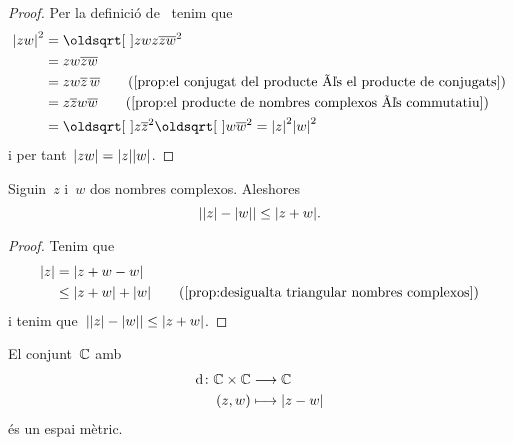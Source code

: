 \documentclass[../Apunts.tex]{subfiles}
\begin{document}
    \begin{proof}
        Per la definició de~ tenim que
        \begin{align*}
            \modul{zw}^{2}&=\sqrt{zwz\conjugat{zw}}^{2} \\
            &=zw\conjugat{zw} \\
            &=zw\conjugat{z}\,\conjugat{w}
            \tag{\ref{prop:el conjugat del producte és el producte de conjugats}} \\
            &=z\conjugat{z}w\conjugat{w}
            \tag{\ref{prop:el producte de nombres complexos és commutatiu}} \\
            &=\sqrt{z\conjugat{z}}^{2}\sqrt{w\conjugat{w}}^{2}=\modul{z}^{2}\modul{w}^{2}
        \end{align*}
        i per tant~\(\modul{zw}=\modul{z}\modul{w}\).
    \end{proof}
    \begin{proposition}
        \label{prop:el valor absolut de la resta de mòduls és més petit o igual que el mòdul de la suma}
        Siguin~\(z\) i~\(w\) dos nombres complexos.
        Aleshores
        \[\abs{\modul{z}-\modul{w}}\leq\modul{z+w}.\]
    \end{proposition}
    \begin{proof}
        Tenim que
        \begin{align*}
            \modul{z}&=\modul{z+w-w} \\
            &\leq\modul{z+w}+\modul{w}
            \tag{\ref{prop:desigualta triangular nombres complexos}}
        \end{align*}
        i tenim que~\(\abs{\modul{z}-\modul{w}}\leq\modul{z+w}\).
    \end{proof}
    \begin{proposition}
        \label{prop:els complexos són un espai mètric}
        El conjunt~\(\mathbb{C}\) amb
        \begin{align*}
            \distancia\colon\CC\times\CC&\longrightarrow\CC \\
            (z,w)&\longmapsto\modul{z-w}
        \end{align*}
        és un espai mètric.
    \end{proposition}
\end{document}
